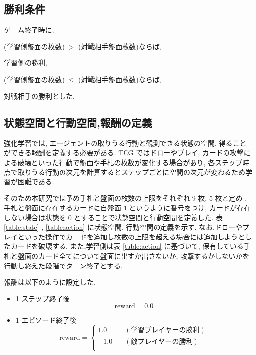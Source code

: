 \documentclass[twocolumn]{jarticle}
\begin{document}
\subsection{勝利条件}
ゲーム終了時に,\par
(学習側盤面の枚数) $>$ (対戦相手盤面枚数)ならば,\par
学習側の勝利, \par 
(学習側盤面の枚数) $\leq$ (対戦相手盤面枚数)ならば,\par
対戦相手の勝利とした.\par 



\subsection{状態空間と行動空間,報酬の定義}
強化学習では, エージェントの取りうる行動と観測できる状態の空間, 得ることができる報酬を定義する必要がある. 
TCG ではドローやプレイ, カードの攻撃による破壊といった行動で盤面や手札の枚数が変化する場合があり, 各ステップ時点で取りうる行動の次元を計算するとステップごとに空間の次元が変わるため学習が困難である.\par
そのため本研究では予め手札と盤面の枚数の上限をそれぞれ 9 枚, 5 枚と定め , 手札と盤面に存在するカードに自盤面 1 というように番号をつけ, カードが存在しない場合は状態を 0 とすることで状態空間と行動空間を定義した. 表 \ref{table:state} , \ref{table:action} に状態空間, 行動空間の定義を示す.
なお,ドローやプレイといった操作でカードを追加し枚数の上限を超える場合には追加しようとしたカードを破壊する.
また,学習側は表 \ref{table:action} に基づいて, 保有している手札と盤面のカード全てについて盤面に出すか出さないか, 攻撃するかしないかを行動し終えた段階でターン終了とする.\par
報酬は以下のように設定した.\par
\begin{itemize}
  \item 1 ステップ終了後 
  \begin{equation*}
   \mathrm{reward} = 0.0  
  \end{equation*}
  \item 1 エピソード終了後
  \begin{equation*}
    \mathrm{reward} = 
    \left\{
      \begin{aligned}
          1.0 \quad & (学習プレイヤーの勝利) \\
          -1.0 \quad & (敵プレイヤーの勝利) \\
      \end{aligned}
      \right.
  \end{equation*} 
\end{itemize}
\end{document}
